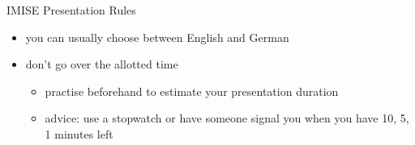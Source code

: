 \documentclass[aspectratio=43]{beamer}
\begin{document}
\begin{frame}{IMISE Presentation Rules}
\begin{itemize}
\item you can usually choose between English and German
\item don't go over the allotted time
\begin{itemize}
\item practise beforehand to estimate your presentation duration 
\item advice: use a stopwatch or have someone signal you when you have 10, 5, 1 minutes left
\end{itemize}
\end{itemize}
\end{frame}
\end{document}
